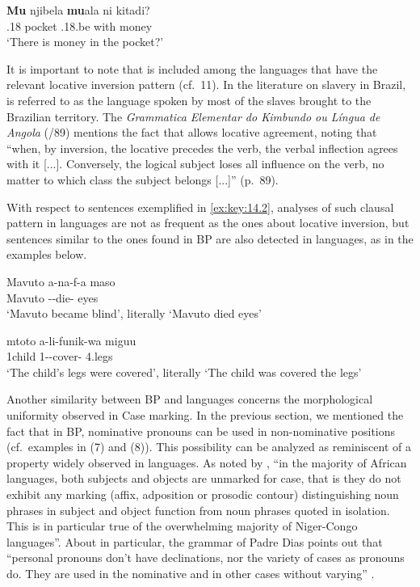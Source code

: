 \documentclass[output=paper]{langsci/langscibook}
\begin{document}
\ea\label{ex:key:14.11}  \parencite[244]{AvelarGalves2016}
    \sn
    \gll    \textbf{Mu} njibela \textbf{mu}ala ni kitadi?\\
            \Loc{}.18 pocket \Loc{}.18.be with money\\
    \glt    ‘There is money in the pocket?’
\z

It is important to note that  is included among the languages that have
the relevant locative inversion pattern (cf.\ 11). In the literature on slavery
in Brazil,  is referred to as the language spoken by most of the slaves
brought to the Brazilian territory. The \emph{Grammatica Elementar do Kimbundo ou Língua de Angola}
(\citealt{Chatelain1888}/89) mentions the fact that  allows locative
agreement, noting that “when, by inversion, the locative precedes the verb, the
verbal inflection agrees with it [...]. Conversely, the logical subject loses
all influence on the verb, no matter to which class the subject belongs [...]”
(p.\ 89).

With respect to  sentences exemplified in \eqref{ex:key:14.2},
analyses of such clausal pattern in  languages are not as frequent as the
ones about locative inversion, but  sentences similar to the
ones found in \gls{BP} are also detected in  languages, as in the
examples below.

\ea\label{ex:key:14.12}  \parencite[23]{Simango2007}
    \sn
    \gll    Mavuto a-na-f-a maso\\
            Mavuto \Sm-\Pst{}-die-\Fv{} eyes\\
    \glt    ‘Mavuto became blind’, literally \enquote*{Mavuto died eyes}
\z

\ea\label{ex:key:14.13}  \parencite[83]{KeachRochemont1992}
    \sn
    \gll    mtoto   a-li-funik-wa miguu\\
            1child 1-\Pst{}-cover-\Pass{} 4.legs\\
    \glt    ‘The child’s legs were covered’, literally ‘The child was covered the legs’
\z

Another similarity between \gls{BP} and  languages concerns the
morphological uniformity observed in Case marking. In the previous section, we
mentioned the fact that in BP, nominative pronouns can be used in
non-nominative positions (cf.\ examples in (7) and (8)). This possibility can
be analyzed as reminiscent of a property widely observed in 
languages. As noted by \citet[233]{Creissels2000}, “in the majority of African
languages, both subjects and objects are unmarked for case, that is they do not
exhibit any marking (affix, adposition or prosodic contour) distinguishing noun
phrases in subject and object function from noun phrases quoted in isolation.
This is in particular true of the overwhelming majority of Niger-Congo
languages”.  About  in particular, the grammar of Padre Dias
points out that “personal pronouns don’t have declinations, nor the variety of
cases as  pronouns do. They are used in the nominative and in other cases without varying” \parencite[8]{Dias2006}.
\end{document}
